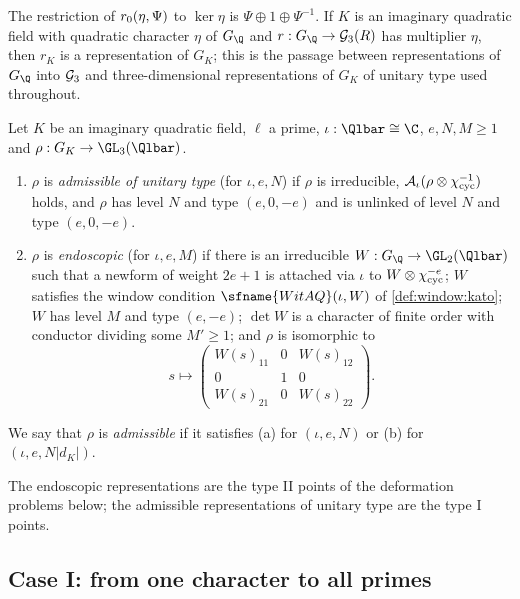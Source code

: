 The restriction of $r_0(\eta,\Psi)$ to $\ker\eta$ is $\Psi\oplus1\oplus\Psi^{-1}$. If $K$ is an imaginary quadratic
field with quadratic character $\eta$ of $G_\Q$ and $r:G_\Q\to\eisGG(R)$ has multiplier $\eta$, then $r_K$ is a
representation of $G_K$; this is the passage between representations of $G_\Q$ into $\mathcal G_3$ and three-dimensional
representations of $G_K$ of unitary type used throughout.

\begin{definition}\label{pf:eis:adm}
Let $K$ be an imaginary quadratic field, $\ell$ a prime, $\iota:\Qlbar\cong\C$, $e,N,M\ge1$ and
$\rho:G_K\to\GL_3(\Qlbar)$.
\begin{enumerate}[label=(\alph*)]
\item $\rho$ is \emph{admissible of unitary type} (for $\iota,e,N$) if $\rho$ is irreducible, $\mathcal A_\iota(\rho\otimes\chi_{\mathrm{cyc}}^{-1})$
  holds, and $\rho$ has level $N$ and type $(e,0,-e)$ and is unlinked of level $N$ and type $(e,0,-e)$.
\item $\rho$ is \emph{endoscopic} (for $\iota,e,M$) if there is an irreducible $W:G_\Q\to\GL_2(\Qlbar)$ such that a
  newform of weight $2e+1$ is attached via $\iota$ to $W\otimes\chi_{\mathrm{cyc}}^{-e}$; $W$ satisfies the window condition
  $\sfname{WitAQ}(\iota,W)$ of \cref{def:window:kato}; $W$ has level $M$ and type $(e,-e)$; $\det W$ is a character of
  finite order with conductor dividing some $M'\ge1$; and $\rho$ is isomorphic to
  \[
   s\longmapsto\begin{pmatrix}W(s)_{11}&0&W(s)_{12}\\0&1&0\\W(s)_{21}&0&W(s)_{22}\end{pmatrix}.
  \]
\end{enumerate}
We say that $\rho$ is \emph{admissible} if it satisfies (a) for $(\iota,e,N)$ or (b) for $(\iota,e,N|d_K|)$.
\end{definition}

The endoscopic representations are the type II points of the deformation problems below; the admissible
representations of unitary type are the type I points.

\subsection{Case I: from one character to all primes}\label{sec:pf:eis:countI}

